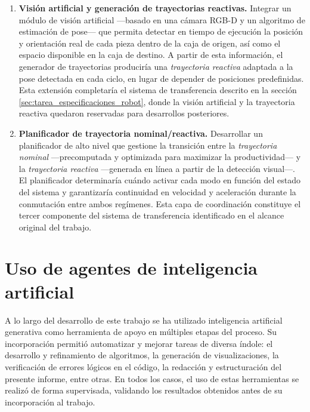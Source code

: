 \documentclass{article}
\begin{document}
\begin{enumerate}
    \item \textbf{Visión artificial y generación de trayectorias reactivas.} Integrar un módulo de visión artificial —basado en una cámara RGB-D y un algoritmo de estimación de pose— que permita detectar en tiempo de ejecución la posición y orientación real de cada pieza dentro de la caja de origen, así como el espacio disponible en la caja de destino. A partir de esta información, el generador de trayectorias produciría una \textit{trayectoria reactiva} adaptada a la pose detectada en cada ciclo, en lugar de depender de posiciones predefinidas. Esta extensión completaría el sistema de transferencia descrito en la sección \ref{sec:tarea_especificaciones_robot}, donde la visión artificial y la trayectoria reactiva quedaron reservadas para desarrollos posteriores.

    \item \textbf{Planificador de trayectoria nominal/reactiva.} Desarrollar un planificador de alto nivel que gestione la transición entre la \textit{trayectoria nominal} —precomputada y optimizada para maximizar la productividad— y la \textit{trayectoria reactiva} —generada en línea a partir de la detección visual—. El planificador determinaría cuándo activar cada modo en función del estado del sistema y garantizaría continuidad en velocidad y aceleración durante la conmutación entre ambos regímenes. Esta capa de coordinación constituye el tercer componente del sistema de transferencia identificado en el alcance original del trabajo.

\end{enumerate}

\section{Uso de agentes de inteligencia artificial}
\label{sec:uso_ia}

A lo largo del desarrollo de este trabajo se ha utilizado inteligencia artificial generativa como herramienta de apoyo en múltiples etapas del proceso. Su incorporación permitió automatizar y mejorar tareas de diversa índole: el desarrollo y refinamiento de algoritmos, la generación de visualizaciones, la verificación de errores lógicos en el código, la redacción y estructuración del presente informe, entre otras. En todos los casos, el uso de estas herramientas se realizó de forma supervisada, validando los resultados obtenidos antes de su incorporación al trabajo.
\end{document}
